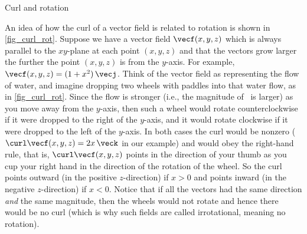 \begin{lxfigure}
\centering
{}
\caption{Curl and rotation}\label{fig_curl_rot}
\end{lxfigure}

An idea of how the curl of a vector field is related to rotation is shown in \autoref{fig_curl_rot}. Suppose we have a vector field $\vecf(x,y,z)$ which is always parallel to the $xy$-plane at each point $(x,y,z)$ and that the vectors grow larger the further the point $(x,y,z)$ is from the $y$-axis. For example, $\vecf(x,y,z) = (1+x^2 )\,\vecj$. Think of the vector field as representing the flow of water, and imagine dropping two wheels with paddles into that water flow, as in \autoref{fig_curl_rot}. Since the flow is stronger (i.e., the magnitude of \vecf\ is larger) as you move away from the $y$-axis, then such a wheel would rotate counterclockwise if it were dropped to the right of the $y$-axis, and it would rotate clockwise if it were dropped to the left of the $y$-axis. In both cases the curl would be nonzero ($\curl\vecf(x,y,z) = 2x\,\veck$ in our example) and would obey the right-hand rule, that is, $\curl\vecf(x,y,z)$ points in the direction of your thumb as you cup your right hand in the direction of the rotation of the wheel. So the curl points outward (in the positive $z$-direction) if $x > 0$ and points inward (in the negative $z$-direction) if $x < 0$. Notice that if all the vectors had the same direction \emph{and} the same magnitude, then the wheels would not rotate and hence there would be no curl (which is why such fields are called irrotational, meaning no rotation).

